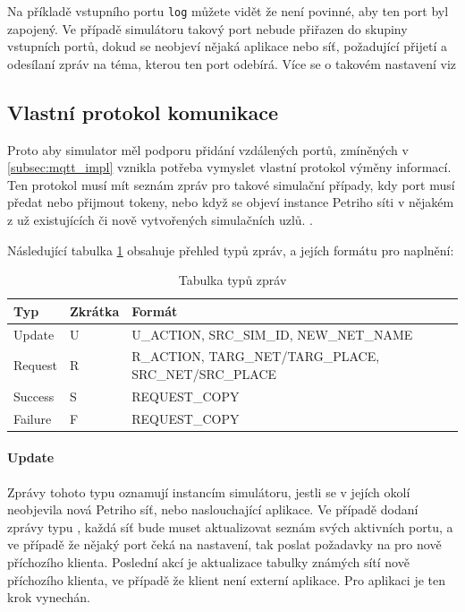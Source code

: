 Na příkladě vstupního portu \texttt{log} můžete vidět že není povinné, aby ten port byl zapojený. Ve případě simulátoru takový port nebude přiřazen do skupiny vstupních portů, dokud se neobjeví nějaká aplikace nebo síť, požadující přijetí a odesílaní zpráv na téma, kterou ten port odebírá. Více se o takovém nastavení viz 

\subsection{Vlastní protokol komunikace}
Proto aby simulator měl podporu přidání vzdálených portů, zmíněných v \ref{subsec:mqtt_impl} vznikla potřeba vymyslet vlastní protokol výměny informací. Ten protokol musí mít seznám zpráv pro takové simulační případy, kdy port musí předat nebo přijmout tokeny, nebo když se objeví instance Petriho síti v nějakém z už existujících či nově vytvořených simulačních uzlů. .

Následující tabulka \ref{tab:mqtt-msg-types} obsahuje přehled typů zpráv, a jejích formátu pro naplnění:

\begin{table}[H]
	\vskip6pt
	\caption{Tabulka typů zpráv}
    \vskip6pt
	\centering
	\begin{tabular}{llllr}
		\toprule
		Typ & Zkrátka & Formát \\
    \midrule
    Update & U & U\_ACTION, SRC\_SIM\_ID, NEW\_NET\_NAME \\
    Request & R & R\_ACTION, TARG\_NET/TARG\_PLACE, SRC\_NET/SRC\_PLACE \\
    Success & S & REQUEST\_COPY \\
    Failure & F & REQUEST\_COPY \\
		\bottomrule
	\end{tabular}
	\label{tab:mqtt-msg-types}
\end{table}

\paragraph{Update} Zprávy tohoto typu oznamují instancím simulátoru, jestli se v jejích okolí neobjevila nová Petriho síť, nebo naslouchající aplikace. Ve případě dodaní zprávy typu , každá síť bude muset aktualizovat seznám svých aktivních portu, a ve případě že nějaký port čeká na nastavení, tak poslat požadavky na pro nově příchozího klienta. Poslední akcí je aktualizace tabulky známých sítí nově příchozího klienta, ve případě že klient není externí aplikace. Pro aplikaci je ten krok vynechán.

